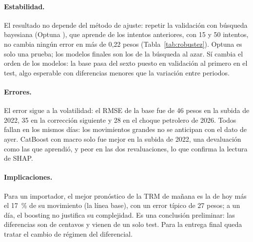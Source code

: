 \documentclass[11pt,letterpaper]{article}
\begin{document}
\paragraph{Estabilidad.} El resultado no depende del método de ajuste: repetir la validación con búsqueda bayesiana (Optuna \cite{optuna}), que aprende de los intentos anteriores, con 15 y 50 intentos, no cambia ningún error en más de 0,22 pesos (Tabla~\ref{tab:robustez}). Optuna es solo una prueba; los modelos finales son los de la búsqueda al azar. Sí cambia el orden de los modelos: la base pasa del sexto puesto en validación al primero en el test, algo esperable con diferencias menores que la variación entre periodos.

\begin{table}[!htbp]
\centering\footnotesize
\setlength{\tabcolsep}{4pt}
\caption{RMSE de validación (media de 5 cortes, en pesos) según el método de ajuste de hiperparámetros.}
\label{tab:robustez}

\end{table}

\paragraph{Errores.} El error sigue a la volatilidad: el RMSE de la base fue de 46 pesos en la subida de 2022, 35 en la corrección siguiente y 28 en el choque petrolero de 2026. Todos fallan en los mismos días: los movimientos grandes no se anticipan con el dato de ayer. CatBoost con macro solo fue mejor en la subida de 2022, una devaluación como las que aprendió, y peor en las dos revaluaciones, lo que confirma la lectura de SHAP.

\paragraph{Implicaciones.} Para un importador, el mejor pronóstico de la TRM de mañana es la de hoy más el 17~\% de su movimiento (la línea base), con un error típico de 27 pesos; a un día, el boosting no justifica su complejidad. Es una conclusión preliminar: las diferencias son de centavos y vienen de un solo test. Para la entrega final queda tratar el cambio de régimen del diferencial.
\end{document}

